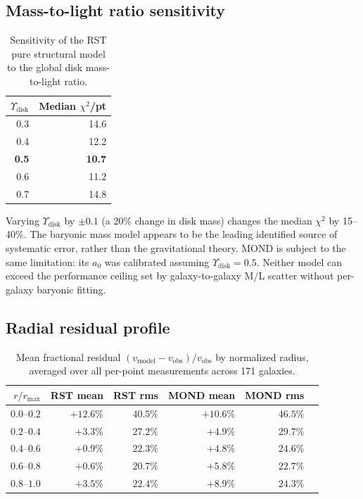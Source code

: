 \documentclass[11pt,a4paper]{article}
\begin{document}
\subsection{Mass-to-light ratio sensitivity}
\label{sec:ml-sensitivity}

\begin{table}[h]
\centering
\caption{Sensitivity of the RST pure structural model to the global disk mass-to-light ratio.}
\label{tab:ml}
\begin{tabular}{rr}
\toprule
$\Upsilon_{\mathrm{disk}}$ & Median $\chi^2$/pt \\
\midrule
0.3 & 14.6 \\
0.4 & 12.2 \\
\textbf{0.5} & \textbf{10.7} \\
0.6 & 11.2 \\
0.7 & 14.8 \\
\bottomrule
\end{tabular}
\end{table}

Varying $\Upsilon_{\mathrm{disk}}$ by $\pm 0.1$ (a 20\% change in disk mass) changes the median $\chi^2$ by 15--40\%.
The baryonic mass model appears to be the leading identified source of systematic error, rather than the gravitational theory.
MOND is subject to the same limitation: its $a_0$ was calibrated assuming $\Upsilon_{\mathrm{disk}} = 0.5$.
Neither model can exceed the performance ceiling set by galaxy-to-galaxy M/L scatter without per-galaxy baryonic fitting.

\subsection{Radial residual profile}
\label{sec:radial}

\begin{table}[h]
\centering
\caption{Mean fractional residual $(v_{\mathrm{model}} - v_{\mathrm{obs}})/v_{\mathrm{obs}}$ by normalized radius, averaged over all per-point measurements across 171 galaxies.}
\label{tab:radial}
\begin{tabular}{rrrrrr}
\toprule
$r/r_{\max}$ & RST mean & RST rms & MOND mean & MOND rms \\
\midrule
$0.0$--$0.2$ & $+12.6\%$ & $40.5\%$ & $+10.6\%$ & $46.5\%$ \\
$0.2$--$0.4$ & $+3.3\%$ & $27.2\%$ & $+4.9\%$ & $29.7\%$ \\
$0.4$--$0.6$ & $+0.9\%$ & $22.3\%$ & $+4.8\%$ & $24.6\%$ \\
$0.6$--$0.8$ & $+0.6\%$ & $20.7\%$ & $+5.8\%$ & $22.7\%$ \\
$0.8$--$1.0$ & $+3.5\%$ & $22.4\%$ & $+8.9\%$ & $24.3\%$ \\
\bottomrule
\end{tabular}
\end{table}
\end{document}
